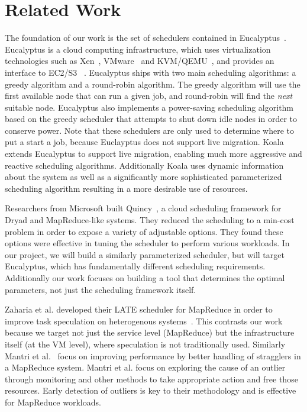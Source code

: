 \section{Related Work}
\label{sec:related}

The foundation of our work is the set of schedulers contained in
Eucalyptus~\cite{Eucalyptus}.  Eucalyptus is a cloud computing infrastructure,
which uses virtualization technologies such as Xen~\cite{Xen},
VMware~\cite{VMware} and KVM/QEMU~\cite{QEMU}, and provides an interface to
EC2/S3 ~\cite{AWS}.   Eucalyptus ships with two main scheduling algorithms: a
greedy algorithm and a round-robin algorithm.  The greedy algorithm will use the
first available node that can run a given job, and round-robin will find the
\emph{next} suitable node.  Eucalyptus also implements a power-saving scheduling
algorithm based on the greedy scheduler that attempts to shut down idle nodes in
order to conserve power.  Note that these schedulers are only used to determine
where to put a start a job, because Euclayptus does not support live migration.
Koala extends Eucalyptus to support live migration, enabling much more
aggressive and reactive scheduling algorithms.  Additionally Koala uses dynamic
information about the system as well as a significantly more sophisticated
parameterized scheduling algorithm resulting in a more desirable use of
resources.

Researchers from Microsoft built Quincy~\cite{Quincy}, a cloud scheduling
framework for Dryad and MapReduce-like systems.  They reduced the scheduling to
a min-cost problem in order to expose a variety of adjustable options.  They
found these options were effective in tuning the scheduler to perform various
workloads.  In our project, we will build a similarly parameterized scheduler,
but will target Eucalyptus, which has fundamentally different scheduling
requirements.  Additionally our work focuses on building a tool that determines
the optimal parameters, not just the scheduling framework itself.

Zaharia et al. developed their LATE scheduler for MapReduce in order to improve
task speculation on heterogenous systems~\cite{Zaharia}.  This contrasts our
work because we target not just the service level (MapReduce) but the
infrastructure itself (at the VM level), where speculation is not traditionally
used.  Similarly Mantri et al.~\cite{Mantri} focus on improving performance by
better handling of stragglers  in a MapReduce system.  Mantri et al. focus on
exploring the cause of an outlier through monitoring and other methods to take
appropriate action and free those resources.  Early detection of outliers is key
to their methodology and is effective for MapReduce workloads.

